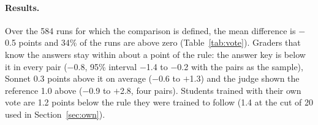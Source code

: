 \paragraph{Results.} Over the 584 runs for which the comparison is defined, the mean difference is $-$0.5 points and 34\% of the runs are above zero (Table~\ref{tab:vote}). Graders that know the answers stay within about a point of the rule: the answer key is below it in every pair ($-$0.8, 95\% interval $-$1.4 to $-$0.2 with the pairs as the sample), Sonnet 0.3 points above it on average ($-$0.6 to $+$1.3) and the judge shown the reference 1.0 above ($-$0.9 to $+$2.8, four pairs). Students trained with their own vote are 1.2 points below the rule they were trained to follow (1.4 at the cut of 20 used in Section~\ref{sec:own}).

\begin{table}[t]
\small
\centering
\setlength{\tabcolsep}{4pt}
\caption{What becomes of each of the untrained student's answers on held-out questions: the share that the trained student answers right, drops (answers with \idk{}), or answers wrong (\%; mean over runs, then over student--dataset pairs). An answer is \emph{confident} if at least 20 of the untrained student's 32 samples agree with it. In brackets: the share the rule drops when it abstains equally often. Collapsed runs are excluded.}
\label{tab:transshares}
\end{table}

